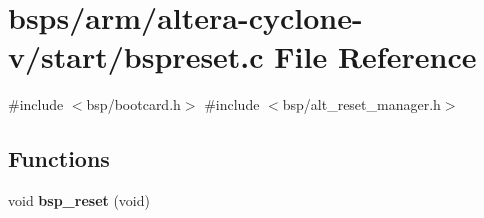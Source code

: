 \hypertarget{arm_2altera-cyclone-v_2start_2bspreset_8c}{}\section{bsps/arm/altera-\/cyclone-\/v/start/bspreset.c File Reference}
\label{arm_2altera-cyclone-v_2start_2bspreset_8c}
{\ttfamily \#include $<$bsp/bootcard.\+h$>$}\newline
{\ttfamily \#include $<$bsp/alt\+\_\+reset\+\_\+manager.\+h$>$}\newline
\subsection*{Functions}
\begin{DoxyCompactItemize}
\item 
void {\bfseries bsp\+\_\+reset} (void)
\end{DoxyCompactItemize}
